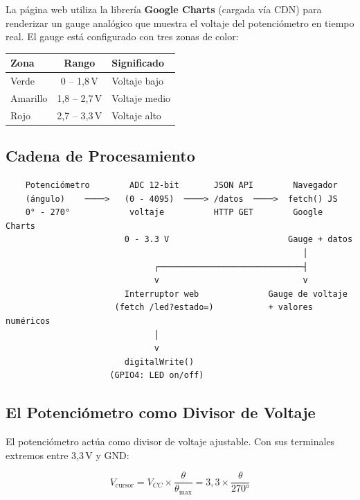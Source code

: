 \documentclass[12pt,a4paper]{article}
\begin{document}
La página web utiliza la librería \textbf{Google Charts} (cargada vía CDN) para renderizar un gauge analógico que muestra el voltaje del potenciómetro en tiempo real. El gauge está configurado con tres zonas de color:

\begin{center}
\begin{tabular}{lcl}
\toprule
\textbf{Zona} & \textbf{Rango} & \textbf{Significado} \\
\midrule
Verde & 0 -- 1,8\,V & Voltaje bajo \\
Amarillo & 1,8 -- 2,7\,V & Voltaje medio \\
Rojo & 2,7 -- 3,3\,V & Voltaje alto \\
\bottomrule
\end{tabular}
\end{center}

\subsection{Cadena de Procesamiento}

\begin{verbatim}
    Potenciómetro        ADC 12-bit       JSON API        Navegador
    (ángulo)    ────>   (0 - 4095)  ────> /datos  ────>  fetch() JS
    0° - 270°            voltaje          HTTP GET        Google Charts
                        0 - 3.3 V                        Gauge + datos
                                                            │
                              ┌─────────────────────────────┤
                              v                             v
                        Interruptor web              Gauge de voltaje
                      (fetch /led?estado=)           + valores numéricos
                              │
                              v
                        digitalWrite()
                     (GPIO4: LED on/off)
\end{verbatim}

\subsection{El Potenciómetro como Divisor de Voltaje}

El potenciómetro actúa como divisor de voltaje ajustable. Con sus terminales extremos entre 3,3\,V y GND:

\begin{equation}
V_{\text{cursor}} = V_{CC} \times \frac{\theta}{\theta_{\max}} = 3{,}3 \times \frac{\theta}{270°}
\label{eq:divisor}
\end{equation}
\end{document}
